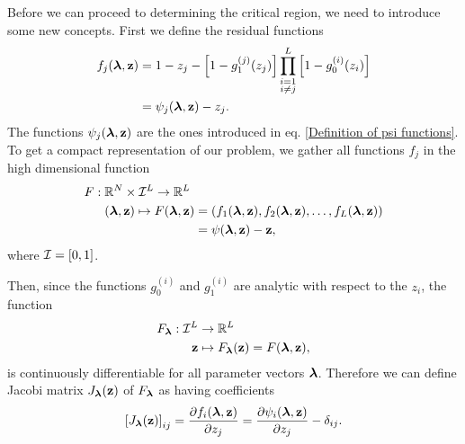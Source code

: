 \documentclass[
11pt, %
english, %
singlespacing, %
nolistspacing, %
liststotoc, %
headsepline, %
]{MastersDoctoralThesis} %
\begin{document}
Before we can proceed to determining the critical region, we need to introduce some new concepts. First we define the residual functions
\begin{align}
	f_j(\boldsymbol{\mathrm{\lambda}}, \boldsymbol{\mathrm{z}}) &= 1 - z_j - \left[1 - g_1^{(j)}(z_j) \right] \prod_{\substack{i = 1 \\ i \neq j}}^{L}  \left[1 - g_0^{(i)}(z_i) \right] \label{Definition fj} \\
		&= \psi_j(\boldsymbol{\mathrm{\lambda}}, \boldsymbol{\mathrm{z}}) - z_j.
\end{align}
The functions $\psi_j(\boldsymbol{\mathrm{\lambda}}, \boldsymbol{\mathrm{z}})$ are the ones introduced in eq. \eqref{Definition of psi functions}. To get a compact representation of our problem, we gather all functions $f_j$ in the high dimensional function
\begin{align}
	F : \; &\mathbb{R}^N \times \unitinterval^L \rightarrow \mathbb{R}^L\\
	&(\lambdavec, \zvec) \mapsto F(\lambdavec, \zvec) = (f_1(\lambdavec, \zvec), f_2(\lambdavec, \zvec), \dots, f_L(\lambdavec, \zvec)) \label{Definition F} \\
		&\hphantom{(\lambdavec, \zvec) \mapsto F(\lambdavec, \zvec)} = \psi(\lambdavec, \zvec) - \zvec,
\end{align}
where $\mathcal{I} = [0, 1]$.

Then, since the functions $g_0^{(i)}$ and $g_1^{(i)}$ are analytic with respect to the $z_i$, the function
\begin{align}
	F_{\boldsymbol{\mathrm{\lambda}}} : \mathcal{I}^L &\rightarrow \mathbb{R}^L\\
		\boldsymbol{\mathrm{z}} &\mapsto F_{\boldsymbol{\mathrm{\lambda}}}(\boldsymbol{\mathrm{z}}) = F(\boldsymbol{\mathrm{\lambda}}, \boldsymbol{\mathrm{z}}),
\end{align}
is continuously differentiable for all parameter vectors $\boldsymbol{\mathrm{\lambda}}$. Therefore we can define Jacobi matrix $J_{\boldsymbol{\mathrm{\lambda}}}(\boldsymbol{\mathrm{z}})$ of $F_{\boldsymbol{\mathrm{\lambda}}}$ as having coefficients
\begin{align}
	\left[ J_{\boldsymbol{\mathrm{\lambda}}}(\boldsymbol{\mathrm{z}}) \right]_{ij} = \frac{\partial f_i(\boldsymbol{\mathrm{\lambda}},\boldsymbol{\mathrm{z}})}{\partial z_j} = \frac{\partial \psi_i(\boldsymbol{\mathrm{\lambda}},\boldsymbol{\mathrm{z}})}{\partial z_j} - \delta_{ij}.
\end{align}
\end{document}
